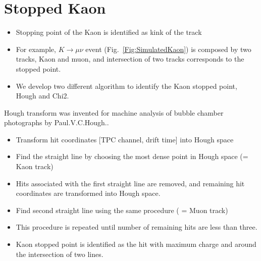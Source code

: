 \section{Stopped Kaon}
\label{Sec:Kaon}
\begin{itemize}
\item Stopping point of the Kaon is identified as kink of the track
\item For example, $K\to\mu\nu$ event (Fig.~\ref{Fig:SimulatedKaon}) is composed by two tracks, Kaon and muon, and intersection of two tracks corresponds to the stopped point.
\item We develop two different algorithm to identify the Kaon stopped point, Hough and Chi2.
\end{itemize}

Hough transform was invented for machine analysis of bubble chamber photographs by Paul.V.C.Hough.\cite{3069654}.
\begin{itemize}
\item Transform hit coordinates [TPC channel, drift time] into Hough space
\item Find the straight line by choosing the most dense point in Hough space (= Kaon track)
\item Hits associated with the first straight line are removed, and remaining hit coordinates are transformed into Hough space.
\item Find second straight line using the same procedure ( = Muon track)
\item This procedure is repeated until number of remaining hits are less than three.
\item Kaon stopped point is identified as the hit with maximum charge and around the intersection of two lines.
\end{itemize}


